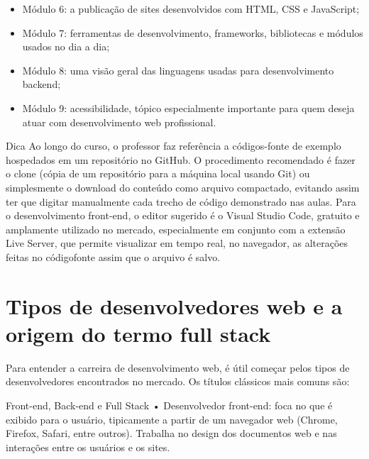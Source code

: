 \begin{itemize}
  \item Módulo 6: a publicação de sites desenvolvidos com HTML, CSS e JavaScript;
\end{itemize}

\begin{itemize}
  \item Módulo 7: ferramentas de desenvolvimento, frameworks, bibliotecas e módulos usados no dia a dia;
\end{itemize}

\begin{itemize}
  \item Módulo 8: uma visão geral das linguagens usadas para desenvolvimento backend;
\end{itemize}

\begin{itemize}
  \item Módulo 9: acessibilidade, tópico especialmente importante para quem deseja atuar com desenvolvimento web profissional.
\end{itemize}

\begin{infobox}{Dica}
Ao longo do curso, o professor faz referência a códigos-fonte de exemplo hospedados em um repositório no GitHub. O procedimento recomendado é fazer o clone (cópia de um repositório para a máquina local usando Git) ou simplesmente o download do conteúdo como arquivo compactado, evitando assim ter que digitar manualmente cada trecho de código demonstrado nas aulas. Para o desenvolvimento front-end, o editor sugerido é o Visual Studio Code, gratuito e amplamente utilizado no mercado, especialmente em conjunto com a extensão Live Server, que permite visualizar em tempo real, no navegador, as alterações feitas no códigofonte assim que o arquivo é salvo.
\end{infobox}

\section{Tipos de desenvolvedores web e a origem do termo full stack}

Para entender a carreira de desenvolvimento web, é útil começar pelos tipos de desenvolvedores encontrados no mercado. Os títulos clássicos mais comuns são:

\begin{infobox}{Front-end, Back-end e Full Stack}
• Desenvolvedor front-end: foca no que é exibido para o usuário, tipicamente a partir de um navegador web (Chrome, Firefox, Safari, entre outros). Trabalha no design dos documentos web e nas interações entre os usuários e os sites.
\end{infobox}

